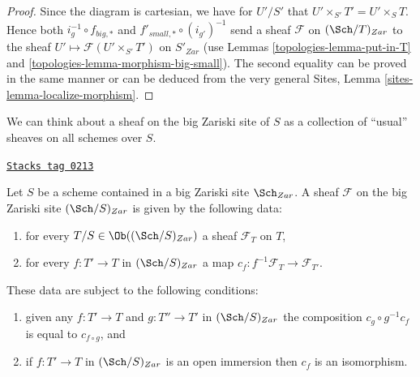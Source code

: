 \begin{proof}

Since the diagram is cartesian, we have for $U'/S'$
that $U' \times_{S'} T' = U' \times_S T$. Hence both
$i_g^{-1} \circ f_{big, *}$ and $f'_{small, *} \circ (i_{g'})^{-1}$
send a sheaf $\mathcal{F}$ on $(\Sch/T)_{Zar}$ to the sheaf
$U' \mapsto \mathcal{F}(U' \times_{S'} T')$ on $S'_{Zar}$
(use Lemmas \ref{topologies-lemma-put-in-T} and \ref{topologies-lemma-morphism-big-small}).
The second equality can be proved in the same manner or can be
deduced from the very general
Sites, Lemma \ref{sites-lemma-localize-morphism}.
\end{proof}

We can think about a sheaf on the big Zariski site of $S$ as a collection
of ``usual'' sheaves on all schemes over $S$.

\begin{lemma}
\label{topologies-lemma-characterize-sheaf-big}
\href{https://stacks.math.columbia.edu/tag/0213}{\texttt{Stacks tag 0213}}

Let $S$ be a scheme contained in a big Zariski site $\Sch_{Zar}$.
A sheaf $\mathcal{F}$ on the big Zariski site $(\Sch/S)_{Zar}$
is given by the following data:
\begin{enumerate}
\item for every $T/S \in \Ob((\Sch/S)_{Zar})$ a sheaf
$\mathcal{F}_T$ on $T$,
\item for every $f : T' \to T$ in
$(\Sch/S)_{Zar}$ a map
$c_f : f^{-1}\mathcal{F}_T \to \mathcal{F}_{T'}$.
\end{enumerate}
These data are subject to the following conditions:
\begin{enumerate}
\item[(a)] given any $f : T' \to T$ and $g : T'' \to T'$ in
$(\Sch/S)_{Zar}$ the composition $c_g \circ g^{-1}c_f$
is equal to $c_{f \circ g}$, and
\item[(b)] if $f : T' \to T$ in $(\Sch/S)_{Zar}$ is an
open immersion then $c_f$ is an isomorphism.
\end{enumerate}
\end{lemma}

